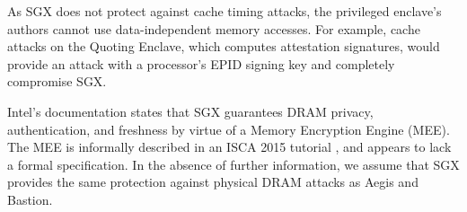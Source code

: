 As SGX does not protect against cache timing attacks, the privileged enclave's
authors cannot use data-independent memory accesses. For example, cache attacks
on the Quoting Enclave, which computes attestation signatures, would provide
an attack with a processor's EPID signing key and completely compromise SGX.

Intel's documentation states that SGX guarantees DRAM privacy, authentication,
and freshness by virtue of a Memory Encryption Engine (MEE). The MEE is
informally described in an ISCA 2015 tutorial \cite{intel2015iscasgx}, and
appears to lack a formal specification. In the absence of further information,
we assume that SGX provides the same protection against physical DRAM attacks
as Aegis and Bastion.
